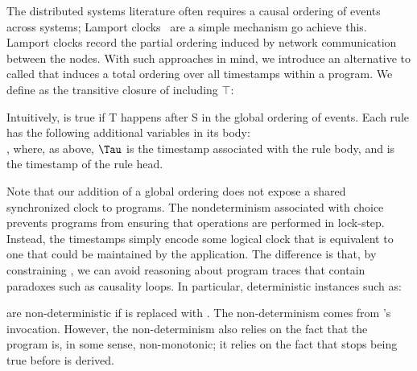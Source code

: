 
The distributed systems literature often requires a causal ordering
of events across systems; Lamport clocks~\cite{lamportclock} are a simple mechanism go achieve this.  Lamport clocks
record the partial ordering induced by network communication between
the nodes.  With such approaches in mind, we introduce an alternative
to  called  that induces a total
ordering over all timestamps within a \lang program.  We define  as the transitive closure of  including $\top$:


Intuitively,  is true if T happens after S in the
global ordering of events.  Each rule  has the
following additional variables in its body:
 \\
, where, as
above, $\Tau$ is the timestamp associated with the rule body, and
 is the timestamp of the rule head.

Note that our addition of a global ordering does not expose a shared
synchronized clock to \lang programs.  The nondeterminism associated with
choice prevents programs from ensuring that operations are performed in
lock-step.  Instead, the timestamps simply encode some logical clock that is
equivalent to one that could be maintained by the application.  The difference
is that, by constraining , we can avoid reasoning about program
traces that contain paradoxes such as causality loops.  In particular,
deterministic instances such as:

are non-deterministic if  is replaced with
.  
The non-determinism comes from 's
 invocation.  However, the non-determinism also relies
on the fact that the program is, in some sense, non-monotonic; it
relies on the fact that  stops being true before
 is derived.


